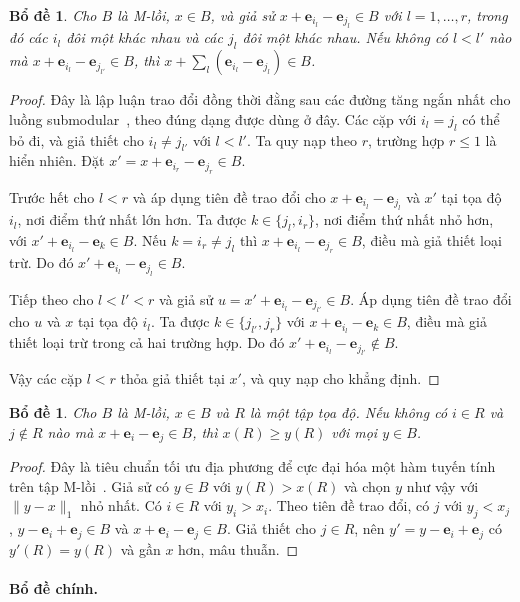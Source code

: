 \documentclass[pdflatex,sn-mathphys-num]{sn-jnl}
\theoremstyle{thmstyleone}
\newtheorem{lemma}[theorem]{Bổ đề}
\theoremstyle{thmstyletwo}
\theoremstyle{thmstylethree}
\newcommand{\e}{\mathbf{e}}
\begin{document}
\begin{lemma}\label{lem:exchange}
Cho $B$ là M-lồi, $x\in B$, và giả sử $x+\e_{i_l}-\e_{j_l}\in B$ với $l=1,\dots,r$, trong đó các $i_l$ đôi một khác nhau và các $j_l$ đôi một khác nhau. Nếu không có $l<l'$ nào mà $x+\e_{i_l}-\e_{j_{l'}}\in B$, thì $x+\sum_l(\e_{i_l}-\e_{j_l})\in B$.
\end{lemma}

\begin{proof}
Đây là lập luận trao đổi đồng thời đằng sau các đường tăng ngắn nhất cho luồng submodular~\cite{cunningham1985,fujishige2005,murota2003}, theo đúng dạng được dùng ở đây. Các cặp với $i_l=j_l$ có thể bỏ đi, và giả thiết cho $i_l\ne j_{l'}$ với $l<l'$. Ta quy nạp theo $r$, trường hợp $r\le1$ là hiển nhiên. Đặt $x'=x+\e_{i_r}-\e_{j_r}\in B$.

Trước hết cho $l<r$ và áp dụng tiên đề trao đổi cho $x+\e_{i_l}-\e_{j_l}$ và $x'$ tại tọa độ $i_l$, nơi điểm thứ nhất lớn hơn. Ta được $k\in\{j_l,i_r\}$, nơi điểm thứ nhất nhỏ hơn, với $x'+\e_{i_l}-\e_k\in B$. Nếu $k=i_r\ne j_l$ thì $x+\e_{i_l}-\e_{j_r}\in B$, điều mà giả thiết loại trừ. Do đó $x'+\e_{i_l}-\e_{j_l}\in B$.

Tiếp theo cho $l<l'<r$ và giả sử $u=x'+\e_{i_l}-\e_{j_{l'}}\in B$. Áp dụng tiên đề trao đổi cho $u$ và $x$ tại tọa độ $i_l$. Ta được $k\in\{j_{l'},j_r\}$ với $x+\e_{i_l}-\e_k\in B$, điều mà giả thiết loại trừ trong cả hai trường hợp. Do đó $x'+\e_{i_l}-\e_{j_{l'}}\notin B$.

Vậy các cặp $l<r$ thỏa giả thiết tại $x'$, và quy nạp cho khẳng định.
\end{proof}

\begin{lemma}\label{lem:localmax}
Cho $B$ là M-lồi, $x\in B$ và $R$ là một tập tọa độ. Nếu không có $i\in R$ và $j\notin R$ nào mà $x+\e_i-\e_j\in B$, thì $x(R)\ge y(R)$ với mọi $y\in B$.
\end{lemma}

\begin{proof}
Đây là tiêu chuẩn tối ưu địa phương để cực đại hóa một hàm tuyến tính trên tập M-lồi~\cite{murota2003}. Giả sử có $y\in B$ với $y(R)>x(R)$ và chọn $y$ như vậy với $\lVert y-x\rVert_1$ nhỏ nhất. Có $i\in R$ với $y_i>x_i$. Theo tiên đề trao đổi, có $j$ với $y_j<x_j$, $y-\e_i+\e_j\in B$ và $x+\e_i-\e_j\in B$. Giả thiết cho $j\in R$, nên $y'=y-\e_i+\e_j$ có $y'(R)=y(R)$ và gần $x$ hơn, mâu thuẫn.
\end{proof}

\paragraph{Bổ đề chính.}
\end{document}

